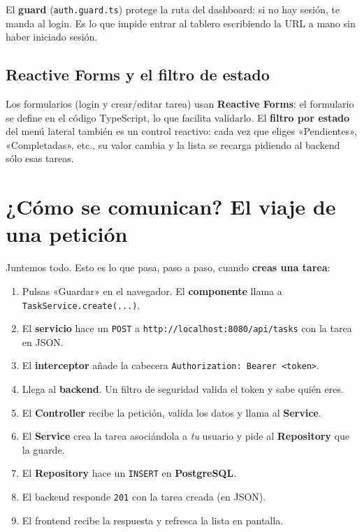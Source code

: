 \documentclass[11pt,a4paper]{article}
\begin{document}
El \textbf{guard} (\verb|auth.guard.ts|) protege la ruta del dashboard: si no hay
sesión, te manda al login. Es lo que impide entrar al tablero escribiendo la URL
a mano sin haber iniciado sesión.

\subsection{Reactive Forms y el filtro de estado}

Los formularios (login y crear/editar tarea) usan \textbf{Reactive Forms}: el
formulario se define en el código TypeScript, lo que facilita validarlo. El
\textbf{filtro por estado} del menú lateral también es un control reactivo: cada
vez que eliges «Pendientes», «Completadas», etc., su valor cambia y la lista se
recarga pidiendo al backend sólo esas tareas.

\section{¿Cómo se comunican? El viaje de una petición}

Juntemos todo. Esto es lo que pasa, paso a paso, cuando \textbf{creas una tarea}:

\begin{enumerate}[leftmargin=*]
  \item Pulsas «Guardar» en el navegador. El \textbf{componente} llama a
  \verb|TaskService.create(...)|.
  \item El \textbf{servicio} hace un \texttt{POST} a
  \verb|http://localhost:8080/api/tasks| con la tarea en JSON.
  \item El \textbf{interceptor} añade la cabecera
  \verb|Authorization: Bearer <token>|.
  \item Llega al \textbf{backend}. Un filtro de seguridad valida el token y sabe
  quién eres.
  \item El \textbf{Controller} recibe la petición, valida los datos y llama al
  \textbf{Service}.
  \item El \textbf{Service} crea la tarea asociándola a \emph{tu} usuario y pide
  al \textbf{Repository} que la guarde.
  \item El \textbf{Repository} hace un \texttt{INSERT} en \textbf{PostgreSQL}.
  \item El backend responde \texttt{201} con la tarea creada (en JSON).
  \item El frontend recibe la respuesta y refresca la lista en pantalla.
\end{enumerate}
\end{document}
